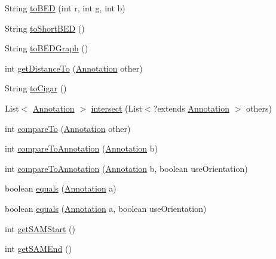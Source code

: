 \begin{DoxyCompactItemize}
\item 
String \hyperlink{classumms_1_1core_1_1annotation_1_1_abstract_annotation_ae8bbe0c165fcc987b3abbc5e6f15e5db}{to\+B\+E\+D} (int r, int g, int b)
\item 
String \hyperlink{classumms_1_1core_1_1annotation_1_1_abstract_annotation_abe5604fd0661f81a1c5c5cc047092ff1}{to\+Short\+B\+E\+D} ()
\item 
String \hyperlink{classumms_1_1core_1_1annotation_1_1_abstract_annotation_aab5866622a3c12689f20483337fdd750}{to\+B\+E\+D\+Graph} ()
\item 
int \hyperlink{classumms_1_1core_1_1annotation_1_1_abstract_annotation_ac8df393754cf49172aadad4b254e5fda}{get\+Distance\+To} (\hyperlink{interfaceumms_1_1core_1_1annotation_1_1_annotation}{Annotation} other)
\item 
String \hyperlink{classumms_1_1core_1_1annotation_1_1_abstract_annotation_a090108988c21b7cc0be0664d2bd2e32a}{to\+Cigar} ()
\item 
List$<$ \hyperlink{interfaceumms_1_1core_1_1annotation_1_1_annotation}{Annotation} $>$ \hyperlink{classumms_1_1core_1_1annotation_1_1_abstract_annotation_afa78e8b538cea72c9b378e60662efac5}{intersect} (List$<$?extends \hyperlink{interfaceumms_1_1core_1_1annotation_1_1_annotation}{Annotation} $>$ others)
\item 
int \hyperlink{classumms_1_1core_1_1annotation_1_1_abstract_annotation_a387f03c8bfb61c496326838af22fa688}{compare\+To} (\hyperlink{interfaceumms_1_1core_1_1annotation_1_1_annotation}{Annotation} other)
\item 
int \hyperlink{classumms_1_1core_1_1annotation_1_1_abstract_annotation_a6526db819c6e715c4b0dfe50a2750b11}{compare\+To\+Annotation} (\hyperlink{interfaceumms_1_1core_1_1annotation_1_1_annotation}{Annotation} b)
\item 
int \hyperlink{classumms_1_1core_1_1annotation_1_1_abstract_annotation_a3aa3a3b7c08fbfa0e96e53ff81fe4ca4}{compare\+To\+Annotation} (\hyperlink{interfaceumms_1_1core_1_1annotation_1_1_annotation}{Annotation} b, boolean use\+Orientation)
\item 
boolean \hyperlink{classumms_1_1core_1_1annotation_1_1_abstract_annotation_a75b34b801266035d089bbeb096e38fd1}{equals} (\hyperlink{interfaceumms_1_1core_1_1annotation_1_1_annotation}{Annotation} a)
\item 
boolean \hyperlink{classumms_1_1core_1_1annotation_1_1_abstract_annotation_a3f56f9b35bdf057ce00672619e1d5b3a}{equals} (\hyperlink{interfaceumms_1_1core_1_1annotation_1_1_annotation}{Annotation} a, boolean use\+Orientation)
\item 
int \hyperlink{classumms_1_1core_1_1annotation_1_1_abstract_annotation_a282494d138b1c62cc03b6202d1ddddef}{get\+S\+A\+M\+Start} ()
\item 
int \hyperlink{classumms_1_1core_1_1annotation_1_1_abstract_annotation_abf8179bf648101ed67eca28075e73a9e}{get\+S\+A\+M\+End} ()
\end{DoxyCompactItemize}
